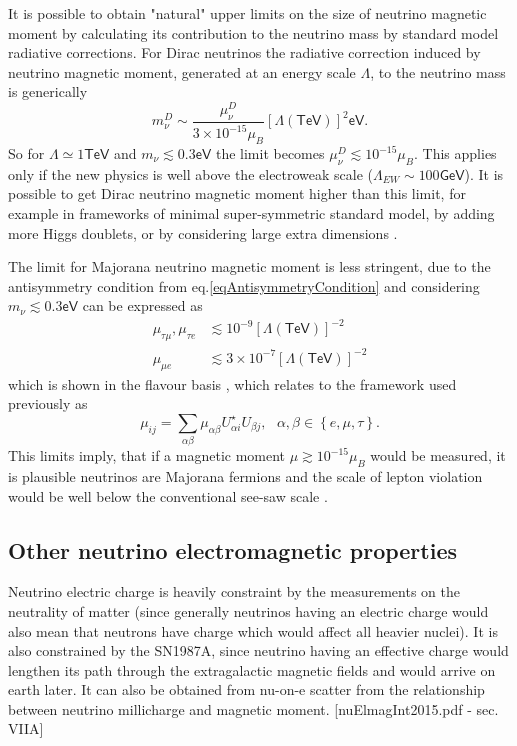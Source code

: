 It is possible \cite{nuMMMajoranaBounds2006.pdf} to obtain "natural" upper limits on the size of neutrino magnetic moment by calculating its contribution to the neutrino mass by standard model radiative corrections. For Dirac neutrinos the radiative correction induced by neutrino magnetic moment, generated at an energy scale $\Lambda$, to the neutrino mass is generically
\begin{equation}
m_{\nu}^D\sim\frac{\mu_{\nu}^D}{3\times 10^{-15}\mu_B}\left[\Lambda\left(\textsf{TeV}\right)\right]^2\textsf{eV}.
\end{equation}
So for $\Lambda\simeq 1\textsf{TeV}$ and $m_{\nu}\lesssim 0.3\textsf{eV}$ the limit becomes $\mu_{\nu}^D\lesssim 10^{-15}\mu_B$. This applies only if the new physics is well above the electroweak scale ($\Lambda_{EW} \sim 100\textsf{GeV}$). It is possible to get Dirac neutrino magnetic moment higher than this limit, for example in frameworks of minimal super-symmetric standard model, by adding more Higgs doublets, or by considering large extra dimensions \cite{nuElmagInt2015.pdf}.

The limit for Majorana neutrino magnetic moment is less stringent, due to the antisymmetry condition from eq.\ref{eqAntisymmetryCondition} and considering $m_{\nu}\lesssim 0.3\textsf{eV}$ can be expressed as
\begin{align}
\mu_{\tau\mu},\mu_{\tau e} &\lesssim 10^{-9}\left[\Lambda\left(\textsf{TeV}\right)\right]^{-2}\\
\mu_{\mu e} &\lesssim 3\times 10^{-7}\left[\Lambda\left(\textsf{TeV}\right)\right]^{-2}
\end{align}
which is shown in the flavour basis , which relates to the framework used previously as
\begin{equation}
\mu_{ij}=\sum_{\alpha\beta}\mu_{\alpha\beta}U^{\star}_{\alpha i}U_{\beta j},\ \ \ \alpha,\beta\in\left\lbrace e,\mu,\tau\right\rbrace.
\end{equation}
This limits imply, that if a magnetic moment $\mu\gtrsim 10^{-15}\mu_B$ would be measured, it is plausible neutrinos are Majorana fermions and the scale of lepton violation would be well below the conventional see-saw scale \cite{nuMMMajoranaBounds2006.pdf}.

\subsection{Other neutrino electromagnetic properties}\label{sec:otherNuElmagProperties}

Neutrino electric charge is heavily constraint by the measurements on the neutrality of matter (since generally neutrinos having an electric charge would also mean that neutrons have charge which would affect all heavier nuclei). It is also constrained by the SN1987A, since neutrino having an effective charge would lengthen its path through the extragalactic magnetic fields and would arrive on earth later. It can also be obtained from nu-on-e scatter from the relationship between neutrino millicharge and magnetic moment. [nuElmagInt2015.pdf - sec. VIIA]


